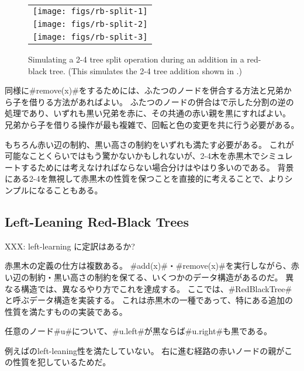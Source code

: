 \begin{figure}
  \begin{center}
   \begin{tabular}{c}
     \texttt{[image: figs/rb-split-1]} \\
     \texttt{[image: figs/rb-split-2]} \\
     \texttt{[image: figs/rb-split-3]} \\
   \end{tabular}
  \end{center}
  \caption[Simulating a 2-4 tree]{Simulating a 2-4 tree split operation
    during an addition in a red-black tree.  (This simulates the 2-4
    tree addition shown in .)}
\end{figure}

同様に#remove(x)#をするためには、ふたつのノードを併合する方法と兄弟から子を借りる方法があればよい。
ふたつのノードの併合はで示した分割の逆の処理であり、いずれも黒い兄弟を赤に、その共通の赤い親を黒にすればよい。
兄弟から子を借りる操作が最も複雑で、回転と色の変更を共に行う必要がある。

もちろん赤い辺の制約、黒い高さの制約をいずれも満たす必要がある。
これが可能なことくらいではもう驚かないかもしれないが、2-4木を赤黒木でシミュレートするためには考えなければならない場合分けはやはり多いのである。
背景にある2-4を無視して赤黒木の性質を保つことを直接的に考えることで、よりシンプルになることもある。

\subsection{Left-Leaning Red-Black Trees}
XXX: left-learning に定訳はあるか?

%
%
赤黒木の定義の仕方は複数ある。
#add(x)#・#remove(x)#を実行しながら、赤い辺の制約・黒い高さの制約を保てる、いくつかのデータ構造があるのだ。
異なる構造では、異なるやり方でこれを達成する。
ここでは、#RedBlackTree#と呼ぶデータ構造を実装する。
%
これは赤黒木の一種であって、特にある追加の性質を満たすものの実装である。
\begin{prp}
  任意のノード#u#について、#u.left#が黒ならば#u.right#も黒である。
\end{prp}
例えばのleft-leaning性を満たしていない。
右に進む経路の赤いノードの親がこの性質を犯しているためだ。


